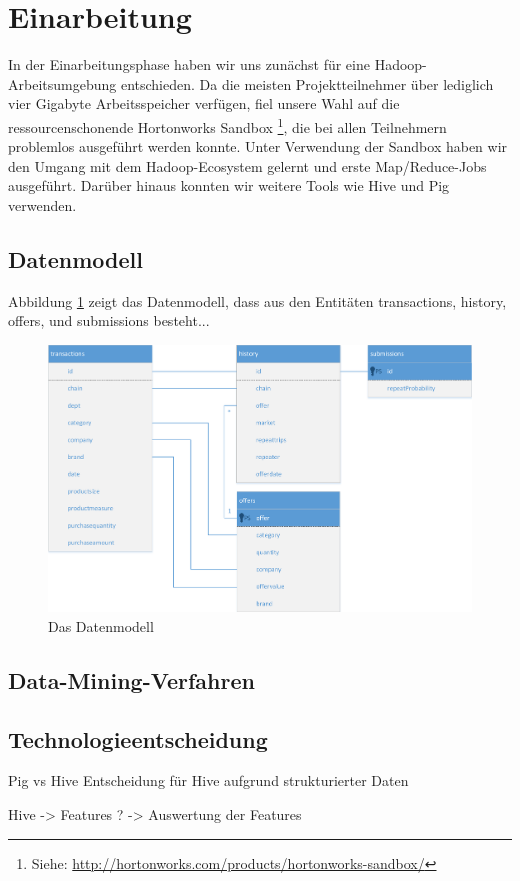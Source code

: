 \section{Einarbeitung}
In der Einarbeitungsphase haben wir uns zunächst für eine Hadoop-Arbeitsumgebung entschieden. Da die meisten Projektteilnehmer über lediglich vier Gigabyte Arbeitsspeicher verfügen, fiel unsere Wahl auf die ressourcenschonende Hortonworks Sandbox \footnote{Siehe: \url{http://hortonworks.com/products/hortonworks-sandbox/}}, die bei allen Teilnehmern problemlos ausgeführt werden konnte. Unter Verwendung der Sandbox haben wir den Umgang mit dem Hadoop-Ecosystem gelernt und erste Map/Reduce-Jobs ausgeführt. Darüber hinaus konnten wir weitere Tools wie Hive und Pig verwenden.

\subsection{Datenmodell}
Abbildung \ref{fig:ShoppersTables} zeigt das Datenmodell, dass aus den Entitäten transactions, history, offers, und submissions besteht...
\begin{figure}[h]
\centering
\includegraphics[width=0.7\linewidth]{Bilder/ShoppersTables}
\caption{Das Datenmodell}
\label{fig:ShoppersTables}
\end{figure}





\subsection{Data-Mining-Verfahren}

\subsection{Technologieentscheidung}

Pig vs Hive
Entscheidung für Hive aufgrund strukturierter Daten

Hive -> Features
? -> Auswertung der Features
